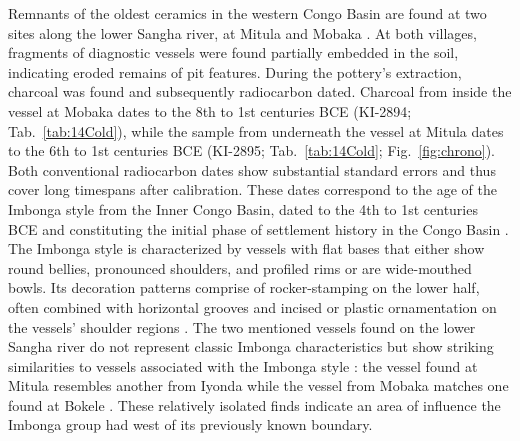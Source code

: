 \documentclass[smallextended,natbib]{svjour3}       %
\begin{document}
Remnants of the oldest ceramics in the western Congo Basin are found at two sites along the lower Sangha river, at Mitula and Mobaka \citep[Fig.~\ref{fig:map};][169--172, 306--307]{Seidensticker.2021e}. At both villages, fragments of diagnostic vessels were found partially embedded in the soil, indicating eroded remains of pit features. During the pottery's extraction, charcoal was found and subsequently radiocarbon dated. Charcoal from inside the vessel at Mobaka dates to the 8th to 1st centuries BCE (KI-2894; Tab.~\ref{tab:14Cold}), while the sample from underneath the vessel at Mitula dates to the 6th to 1st centuries BCE (KI-2895; Tab.~\ref{tab:14Cold}; Fig.~\ref{fig:chrono}). Both conventional radiocarbon dates show substantial standard errors and thus cover long timespans after calibration. These dates correspond to the age of the Imbonga style from the Inner Congo Basin, dated to the 4th to 1st centuries BCE and constituting the initial phase of settlement history in the Congo Basin \citep[Fig.~\ref{fig:chrono}; S1; Tab.~S1;][59--68]{Wotzka.1995}. The Imbonga style is characterized by vessels with flat bases that either show round bellies, pronounced shoulders, and profiled rims or are wide-mouthed bowls. Its decoration patterns comprise of rocker-stamping on the lower half, often combined with horizontal grooves and incised or plastic ornamentation on the vessels' shoulder regions \citep[196 Fig.~93.1--4]{Seidensticker.2021e}. The two mentioned vessels found on the lower Sangha river do not represent classic Imbonga characteristics but show striking similarities to vessels associated with the Imbonga style \citep[170 Fig.~84]{Seidensticker.2021e}: the vessel found at Mitula resembles another from Iyonda \citep[441 Pl.~7.7]{Wotzka.1995} while the vessel from Mobaka matches one found at Bokele \citep[453 Pl.~19.10]{Wotzka.1995}. These relatively isolated finds indicate an area of influence the Imbonga group had west of its previously known boundary.
\end{document}

